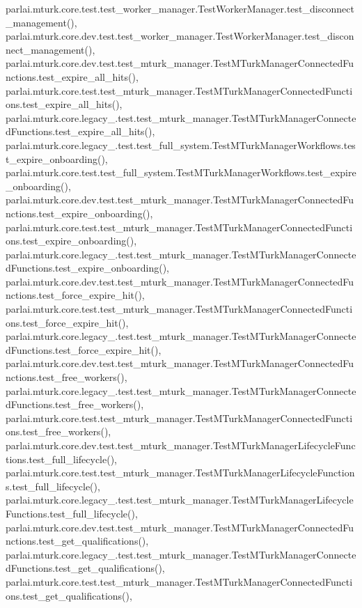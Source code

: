 parlai.\+mturk.\+core.\+test.\+test\+\_\+worker\+\_\+manager.\+Test\+Worker\+Manager.\+test\+\_\+disconnect\+\_\+management(), parlai.\+mturk.\+core.\+dev.\+test.\+test\+\_\+worker\+\_\+manager.\+Test\+Worker\+Manager.\+test\+\_\+disconnect\+\_\+management(), parlai.\+mturk.\+core.\+dev.\+test.\+test\+\_\+mturk\+\_\+manager.\+Test\+M\+Turk\+Manager\+Connected\+Functions.\+test\+\_\+expire\+\_\+all\+\_\+hits(), parlai.\+mturk.\+core.\+test.\+test\+\_\+mturk\+\_\+manager.\+Test\+M\+Turk\+Manager\+Connected\+Functions.\+test\+\_\+expire\+\_\+all\+\_\+hits(), parlai.\+mturk.\+core.\+legacy\+\_.\+test.\+test\+\_\+mturk\+\_\+manager.\+Test\+M\+Turk\+Manager\+Connected\+Functions.\+test\+\_\+expire\+\_\+all\+\_\+hits(), parlai.\+mturk.\+core.\+legacy\+\_.\+test.\+test\+\_\+full\+\_\+system.\+Test\+M\+Turk\+Manager\+Workflows.\+test\+\_\+expire\+\_\+onboarding(), parlai.\+mturk.\+core.\+test.\+test\+\_\+full\+\_\+system.\+Test\+M\+Turk\+Manager\+Workflows.\+test\+\_\+expire\+\_\+onboarding(), parlai.\+mturk.\+core.\+dev.\+test.\+test\+\_\+mturk\+\_\+manager.\+Test\+M\+Turk\+Manager\+Connected\+Functions.\+test\+\_\+expire\+\_\+onboarding(), parlai.\+mturk.\+core.\+test.\+test\+\_\+mturk\+\_\+manager.\+Test\+M\+Turk\+Manager\+Connected\+Functions.\+test\+\_\+expire\+\_\+onboarding(), parlai.\+mturk.\+core.\+legacy\+\_.\+test.\+test\+\_\+mturk\+\_\+manager.\+Test\+M\+Turk\+Manager\+Connected\+Functions.\+test\+\_\+expire\+\_\+onboarding(), parlai.\+mturk.\+core.\+dev.\+test.\+test\+\_\+mturk\+\_\+manager.\+Test\+M\+Turk\+Manager\+Connected\+Functions.\+test\+\_\+force\+\_\+expire\+\_\+hit(), parlai.\+mturk.\+core.\+test.\+test\+\_\+mturk\+\_\+manager.\+Test\+M\+Turk\+Manager\+Connected\+Functions.\+test\+\_\+force\+\_\+expire\+\_\+hit(), parlai.\+mturk.\+core.\+legacy\+\_.\+test.\+test\+\_\+mturk\+\_\+manager.\+Test\+M\+Turk\+Manager\+Connected\+Functions.\+test\+\_\+force\+\_\+expire\+\_\+hit(), parlai.\+mturk.\+core.\+dev.\+test.\+test\+\_\+mturk\+\_\+manager.\+Test\+M\+Turk\+Manager\+Connected\+Functions.\+test\+\_\+free\+\_\+workers(), parlai.\+mturk.\+core.\+legacy\+\_.\+test.\+test\+\_\+mturk\+\_\+manager.\+Test\+M\+Turk\+Manager\+Connected\+Functions.\+test\+\_\+free\+\_\+workers(), parlai.\+mturk.\+core.\+test.\+test\+\_\+mturk\+\_\+manager.\+Test\+M\+Turk\+Manager\+Connected\+Functions.\+test\+\_\+free\+\_\+workers(), parlai.\+mturk.\+core.\+dev.\+test.\+test\+\_\+mturk\+\_\+manager.\+Test\+M\+Turk\+Manager\+Lifecycle\+Functions.\+test\+\_\+full\+\_\+lifecycle(), parlai.\+mturk.\+core.\+test.\+test\+\_\+mturk\+\_\+manager.\+Test\+M\+Turk\+Manager\+Lifecycle\+Functions.\+test\+\_\+full\+\_\+lifecycle(), parlai.\+mturk.\+core.\+legacy\+\_.\+test.\+test\+\_\+mturk\+\_\+manager.\+Test\+M\+Turk\+Manager\+Lifecycle\+Functions.\+test\+\_\+full\+\_\+lifecycle(), parlai.\+mturk.\+core.\+dev.\+test.\+test\+\_\+mturk\+\_\+manager.\+Test\+M\+Turk\+Manager\+Connected\+Functions.\+test\+\_\+get\+\_\+qualifications(), parlai.\+mturk.\+core.\+legacy\+\_.\+test.\+test\+\_\+mturk\+\_\+manager.\+Test\+M\+Turk\+Manager\+Connected\+Functions.\+test\+\_\+get\+\_\+qualifications(), parlai.\+mturk.\+core.\+test.\+test\+\_\+mturk\+\_\+manager.\+Test\+M\+Turk\+Manager\+Connected\+Functions.\+test\+\_\+get\+\_\+qualifications(), 
